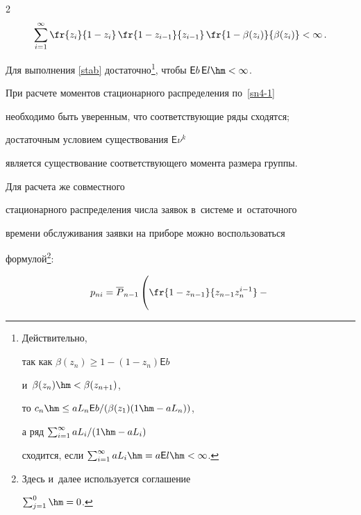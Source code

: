 \begin{multicols}{2}
\begin{equation}


\label{stab}


\sum\limits_{i=1}^\infty


\fr{z_{i}}{1-z_{i}}\,


\fr{1-z_{i-1}}{z_{i-1}}\,


\fr{1- \beta(z_i)}{\beta(z_i)}


< \infty\,.


\end{equation}





\noindent 


Для выполнения \eqref{stab} достаточно\footnote{Действительно,


так как $\beta(z_n) \ge 1- (1-z_n) \mathsf{E}b$ 


и~$\beta(z_n)\hm<\beta(z_{n+1})$,


то $c_n\hm\le a L_n \mathsf{E}b/(\beta(z_1)(1\hm- a L_n))$,


а ряд $\sum\nolimits_{i=1}^\infty aL_i /(1\hm- a L_i)$


сходится, если $\sum\nolimits_{i=1}^\infty aL_i \hm= a \mathsf{E}l 


\hm<\infty$.}, чтобы $\mathsf{E}b \, \mathsf{E}l \hm< \infty$.


При расчете моментов стационарного распределения по~\eqref{sn4-1}


необходимо быть уверенным, что соответствующие ряды сходятся;


достаточным условием существования $\mathsf{E}\nu^k$


является существование соответствующего момента размера группы.


Для расчета же совместного


стационарного распределения числа заявок в~системе и~остаточного


времени обслуживания заявки на приборе можно воспользоваться


формулой\footnote{Здесь и~далее используется соглашение


$\sum\nolimits_{j=1}^0\hm=0$.}:


\begin{multline*}


p_{ni}={\overline P}_{n-1}


\left(\fr{1-z_{n-1}}{z_{n-1} z_n^{i-1}}-


\vphantom{\sum\limits_{j=1}^{i-1}} 


{}\right.\\



\end{multline*}
\end{multicols}
